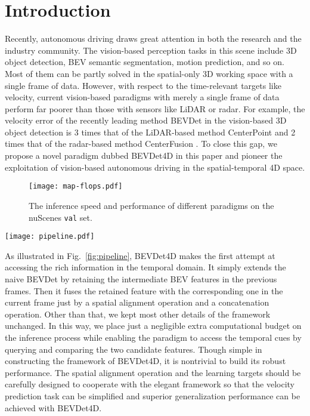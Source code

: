 \documentclass[10pt,twocolumn,letterpaper]{article}
\begin{document}
\section{Introduction}
Recently, autonomous driving draws great attention in both the research and the industry community. The vision-based perception tasks in this scene include 3D object detection, BEV semantic segmentation, motion prediction, and so on. Most of them can be partly solved in the spatial-only 3D working space with a single frame of data. However, with respect to the time-relevant targets like velocity, current vision-based paradigms with merely a single frame of data perform far poorer than those with sensors like LiDAR or radar. For example, the velocity error of the recently leading method BEVDet \cite{BEVDet} in the vision-based 3D object detection is 3 times that of the LiDAR-based method CenterPoint \cite{CenterPoint3D} and 2 times that of the radar-based method CenterFusion \cite{Centerfusion}. To close this gap, we propose a novel paradigm dubbed BEVDet4D in this paper and pioneer the exploitation of vision-based autonomous driving in the spatial-temporal 4D space.

\begin{figure}[t]
		\centering
		\texttt{[image: map-flops.pdf]}
		\caption{The inference speed and performance of different paradigms on the nuScenes \texttt{val} set.}
		\label{fig:map-flops}
\end{figure}


\begin{figure*}[t]
		\centering
		\texttt{[image: pipeline.pdf]}
		\caption{The framework of the proposed BEVDet4D paradigm. BEVDet4D retains the intermediate BEV feature of the previous frame and concatenates it with the ones generated by the current frame. Before that spatial alignment in the flat plane is conducted to partially simplify the velocity prediction task.}
		\label{fig:pipeline}
\end{figure*}

As illustrated in Fig.~\ref{fig:pipeline}, BEVDet4D makes the first attempt at accessing the rich information in the temporal domain. It simply extends the naive BEVDet \cite{BEVDet} by retaining the intermediate BEV features in the previous frames. Then it fuses the retained feature with the corresponding one in the current frame just by a spatial alignment operation and a concatenation operation. Other than that, we kept most other details of the framework unchanged. In this way, we place just a negligible extra computational budget on the inference process while enabling the paradigm to access the temporal cues by querying and comparing the two candidate features. Though simple in constructing the framework of BEVDet4D, it is nontrivial to build its robust performance. The spatial alignment operation and the learning targets should be carefully designed to cooperate with the elegant framework so that the velocity prediction task can be simplified and superior generalization performance can be achieved with BEVDet4D.
\end{document}
